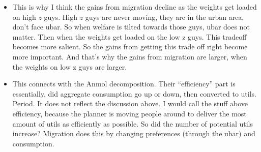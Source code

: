 \documentclass[12pt,pdftex]{article}
\begin{document}
\begin{onehalfspacing}
\begin{itemize}
\item This is why I think the gains from migration decline as the weights get loaded on high $z$ guys. High $z$ guys are never moving, they are in the urban area, don't face ubar. So when welfare is tilted towards those guys, ubar does not matter. Then when the weights get loaded on the low z guys. This tradeoff becomes more salient. So the gains from getting this trade off right become more important. And that's why the gains from migration are larger, when the weights on low z guys are larger. 

\item This connects with the Anmol decomposition. Their ``efficiency'' part is essentially, did aggregate consumption go up or down, then converted to utils. Period. It does not reflect the discussion above. I would call the stuff above efficiency, because the planner is moving people around to deliver the most amount of utils as efficiently as possible. So did the number of potential utils increase? Migration does this by changing preferences (through the ubar) and consumption.
    
\end{itemize}
\newpage






\end{onehalfspacing}
\end{document}
